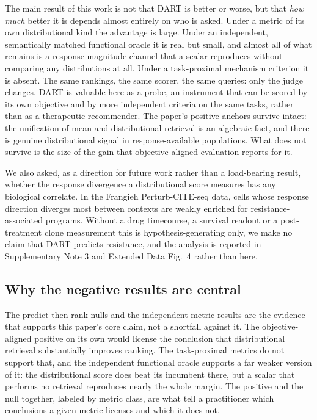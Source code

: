 \documentclass[11pt,letterpaper]{article}
\begin{document}
The main result of this work is not that DART is better or worse, but that \emph{how much} better
it is depends almost entirely on who is asked. Under a metric of its own distributional kind the
advantage is large. Under an independent, semantically matched functional oracle it is real but
small, and almost all of what remains is a response-magnitude channel that a scalar reproduces
without comparing any distributions at all. Under a task-proximal mechanism criterion it is
absent. The same rankings, the same scorer, the same queries: only the judge changes. DART is
valuable here as a probe, an instrument that can be scored by its own objective and by
more independent criteria on the same tasks, rather than as a therapeutic recommender. The paper's
positive anchors survive intact: the unification of mean and distributional retrieval is an
algebraic fact, and there is genuine distributional signal in response-available populations. What
does not survive is the size of the gain that objective-aligned evaluation reports for it.

We also asked, as a direction for future work rather than a load-bearing result, whether the
response divergence a distributional score measures has any biological correlate. In the Frangieh
Perturb-CITE-seq data, cells whose response direction diverges most between contexts are weakly
enriched for resistance-associated programs. Without a drug timecourse, a survival readout or a
post-treatment clone measurement this is hypothesis-generating only, we make no claim that
DART predicts resistance, and the analysis is reported in Supplementary Note 3 and Extended Data
Fig.~4 rather than here.

\subsection*{Why the negative results are central}

The predict-then-rank nulls and the independent-metric results are the evidence that supports this
paper's core claim, not a shortfall against it. The objective-aligned positive on its own would
license the conclusion that distributional retrieval substantially improves ranking. The
task-proximal metrics do not support that, and the independent functional oracle supports a far
weaker version of it: the distributional score does beat its incumbent there, but a scalar that
performs no retrieval reproduces nearly the whole margin. The positive and the null together,
labeled by metric class, are what tell a practitioner which conclusions a given metric licenses
and which it does not.
\end{document}

